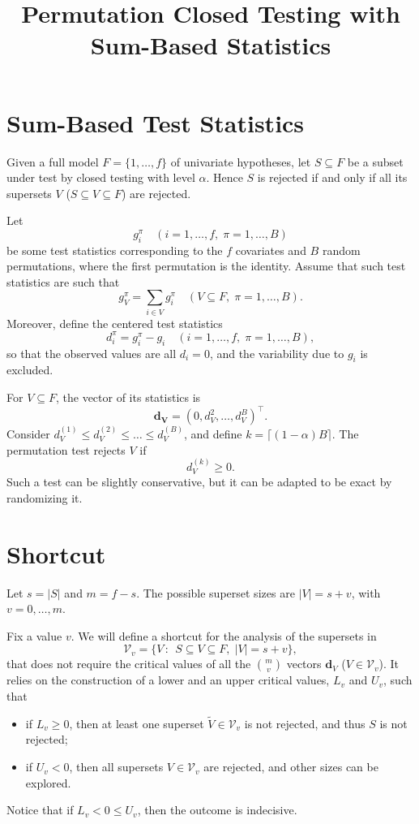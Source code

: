 \documentclass[11pt,a4paper,openright,twoside]{article}
\title{Permutation Closed Testing with Sum-Based Statistics}
\author{}
\date{}
\begin{document}
\maketitle


\section{Sum-Based Test Statistics}
Given a full model $F=\{1,\ldots, f\}$ of univariate hypotheses, let $S\subseteq F$ be a subset under test by closed testing with level $\alpha$. Hence $S$ is rejected if and only if all its supersets $V$ ($S\subseteq V\subseteq F$) are rejected.

Let
\[g_i^\pi\quad (i=1,\ldots,f,\; \pi=1,\ldots,B)\]
be some test statistics corresponding to the $f$ covariates and $B$ random permutations, where the first permutation is the identity. Assume that such test statistics are such that
\[g_V^\pi=\sum_{i\in V}g_i^\pi\quad (V\subseteq F,\;\pi=1,\ldots,B).\]
Moreover, define the centered test statistics
\[d_i^\pi = g_i^\pi - g_i \quad (i=1,\ldots,f,\; \pi=1,\ldots,B),\]
so that the observed values are all $d_i=0$, and the variability due to $g_i$ is excluded.

For $V\subseteq F$, the vector of its statistics is
\[\mathbf{d_V}=(0,d_V^2,\ldots,d_V^B)^\top.\]
Consider $d_V^{(1)}\leq d_V^{(2)}\leq\ldots\leq d_V^{(B)}$, and define $k=\lceil (1-\alpha) B\rceil$. The permutation test rejects $V$ if
\[d_V^{(k)}\geq 0.\]
Such a test can be slightly conservative, but it can be adapted to be exact by randomizing it.







\vspace{10mm}

\section{Shortcut}
Let $s=|S|$ and $m=f-s$. The possible superset sizes are $|V|=s+v$, with $v=0,\ldots,m$.

Fix a value $v$. We will define a shortcut for the analysis of the supersets in
\[\mathcal{V}_v=\{V\,:\,\;S\subseteq V\subseteq F,\; |V|=s+v\},\]
that does not require the critical values of all the $\binom{m}{v}$ vectors $\mathbf{d}_V$ ($V\in\mathcal{V}_v$). It relies on the construction of a lower and an upper critical values, $L_v$ and $U_v$, such that
\begin{itemize}
\item if $L_v\geq 0$, then at least one superset $\tilde{V}\in\mathcal{V}_v$ is not rejected, and thus $S$ is not rejected;
\item if $U_v<0$, then all supersets $V\in\mathcal{V}_v$ are rejected, and other sizes can be explored.
\end{itemize}
Notice that if $L_v< 0\leq U_v$, then the outcome is indecisive. 
\end{document}
